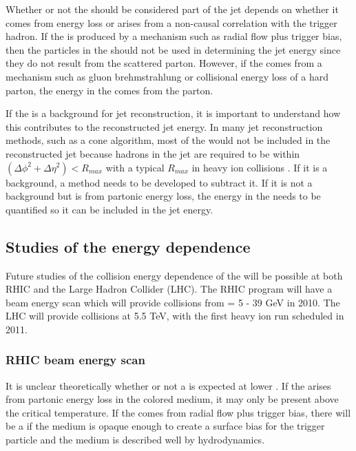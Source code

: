 Whether or not the \ridge should be considered part of the jet depends on whether it comes from energy loss or arises from a non-causal correlation with the trigger hadron.  If the \ridge is produced by a mechanism such as radial flow plus trigger bias, then the particles in the \ridge should not be used in determining the jet energy since they do not result from the scattered parton.  However, if the \ridge comes from a mechanism such as gluon brehmstrahlung or collisional energy loss of a hard parton, the energy in the \ridge comes from the parton.

If the \ridge is a background for jet reconstruction, it is important to understand how this contributes to the reconstructed jet energy.  In many jet reconstruction methods, such as a cone algorithm, most of the \ridge would not be included in the reconstructed jet because hadrons in the jet are required to be within $(\Delta\phi^2 + \Delta\eta^2)<R_{max}$ with a typical $R_{max}$ in heavy ion collisions \cite{Putschke:2008wn}.  If it is a background, a method needs to be developed to subtract it.  If it is not a background but is from partonic energy loss, the energy in the \ridge needs to be quantified so it can be included in the jet energy.

\subsection{Studies of the energy dependence}

Future studies of the collision energy dependence of the \ridge will be possible at both RHIC and the Large Hadron Collider (LHC).  The RHIC program will have a beam energy scan which will provide \Au collisions from \sNN = 5 - 39 GeV in 2010.  The LHC will provide \Pb collisions at 5.5 TeV, with the first heavy ion run scheduled in 2011.

\subsubsection{RHIC beam energy scan}

It is unclear theoretically whether or not a \ridge is expected at lower \sNN.  If the \ridge arises from partonic energy loss in the colored medium, it may only be present above the critical temperature.  If the \ridge comes from radial flow plus trigger bias, there will be a \ridge if the medium is opaque enough to create a surface bias for the trigger particle and the medium is described well by hydrodynamics.

